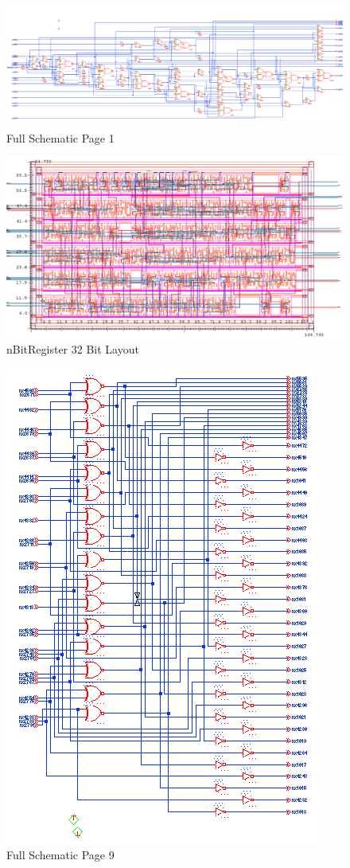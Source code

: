 \documentclass[11pt]{article}
\begin{document}
	
	\begin{figure}[H] 
		\centering 
		\includegraphics[width=0.7\linewidth]{"Pictures/Full Schematic Page 1"}
		\caption{Full Schematic Page 1} 
		\label{fig:Full-Schematic-Page-1} 
	\end{figure}
	
	
	\begin{figure}[H] 
		\centering 
		\includegraphics[width=0.7\linewidth]{"Pictures/nBitRegister 32-Bit Layout"}
		\caption{nBitRegister 32 Bit Layout} 
		\label{fig:nBitRegister-32-Bit-Layout} 
	\end{figure}
	
	
	\begin{figure}[H] 
		\centering 
		\includegraphics[width=0.7\linewidth]{"Pictures/Full Schematic Page 9"}
		\caption{Full Schematic Page 9} 
		\label{fig:Full-Schematic-Page-9} 
	\end{figure}
	
\end{document}
